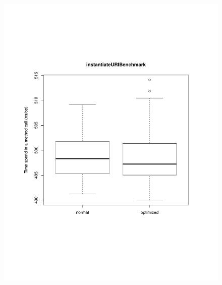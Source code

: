 \begin{figure}[H]
	\centering
	
	\centerline{
		\includegraphics[trim=0mm 60mm 20mm 50mm,scale=0.50]{pictures/boxplot_instantiateURI.pdf}
}
\end{figure}

